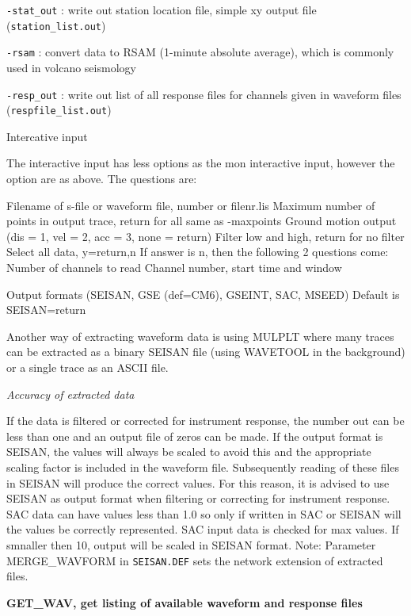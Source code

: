 \texttt{-stat\_out} : write out station location file, simple xy output file (\texttt{station\_list.out}) 

\texttt{-rsam} : convert data to RSAM (1-minute absolute average), which is commonly used in volcano seismology 

\texttt{-resp\_out} : write out list of all response files for channels given in waveform files (\texttt{respfile\_list.out}) 

%
Intercative input

The interactive input has less options as the mon interactive input, however the option are as above.
The questions are:

Filename of s-file or waveform file, number or filenr.lis
Maximum number of points in output trace, return for all           same as -maxpoints
Ground motion output (dis = 1, vel = 2, acc = 3, none = return)
Filter low and high, return for no filter
Select all data, y=return,n
    If answer is n, then the following 2 questions come:
Number of channels to read
Channel number, start time and window

Output formats (SEISAN, GSE (def=CM6), GSEINT, SAC, MSEED)
Default is SEISAN=return



Another way of extracting waveform data is using MULPLT where many traces can be extracted as a binary SEISAN file (using WAVETOOL in the background) or a single trace as an ASCII file.  

\textit{Accuracy of extracted data}

If the data is filtered or corrected for instrument response, the number out can be less than one and an output file of zeros can be made. If the output format is SEISAN, the values will always be scaled to avoid this and the appropriate scaling factor is included in the waveform file. Subsequently reading of these files in SEISAN will produce the correct values. For this reason, it is advised to use SEISAN as output format when filtering or correcting for instrument response.
SAC data can have values less than 1.0 so only if written in SAC or SEISAN will the values be correctly represented.  
SAC input data is checked for max values. If smnaller then 10, output will be scaled in SEISAN format.
Note: Parameter MERGE\_WAVFORM in \texttt{SEISAN.DEF} sets the network extension of extracted files. 

\textbf{GET\_WAV, get listing of available waveform  and response files}

